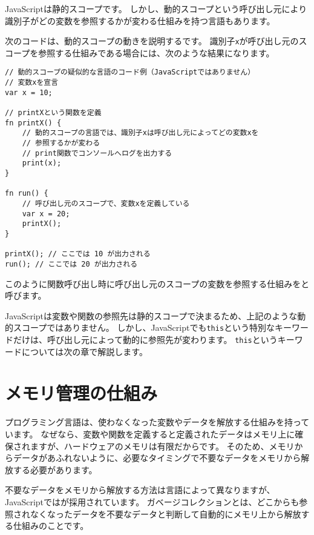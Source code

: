 \begin{tcolorbox}[title=動的スコープ]\label{dynamic-scope}

JavaScriptは静的スコープです。
しかし、動的スコープという呼び出し元により識別子がどの変数を参照するかが変わる仕組みを持つ言語もあります。

次のコードは、動的スコープの動きを説明する\textbf{}です。
識別子\texttt{x}が呼び出し元のスコープを参照する仕組みである場合には、次のような結果になります。

\begin{lstlisting}
// 動的スコープの疑似的な言語のコード例（JavaScriptではありません）
// 変数xを宣言
var x = 10;

// printXという関数を定義
fn printX() {
    // 動的スコープの言語では、識別子xは呼び出し元によってどの変数xを
    // 参照するかが変わる
    // print関数でコンソールへログを出力する
    print(x);
}

fn run() {
    // 呼び出し元のスコープで、変数xを定義している
    var x = 20;
    printX();
}

printX(); // ここでは 10 が出力される
run(); // ここでは 20 が出力される
\end{lstlisting}

このように関数呼び出し時に呼び出し元のスコープの変数を参照する仕組みを\textbf{}と呼びます。

JavaScriptは変数や関数の参照先は静的スコープで決まるため、上記のような動的スコープではありません。
しかし、JavaScriptでも\texttt{this}という特別なキーワードだけは、呼び出し元によって動的に参照先が変わります。
\texttt{this}というキーワードについては次の章で解説します。
\end{tcolorbox}

\hypertarget{memory-management}{%
\section{メモリ管理の仕組み}\label{memory-management}}

プログラミング言語は、使わなくなった変数やデータを解放する仕組みを持っています。
なぜなら、変数や関数を定義すると定義されたデータはメモリ上に確保されますが、ハードウェアのメモリは有限だからです。
そのため、メモリからデータがあふれないように、必要なタイミングで不要なデータをメモリから解放する必要があります。

不要なデータをメモリから解放する方法は言語によって異なりますが、JavaScriptでは\textbf{}が採用されています。
ガベージコレクションとは、どこからも参照されなくなったデータを不要なデータと判断して自動的にメモリ上から解放する仕組みのことです。

